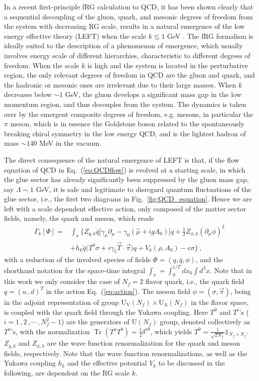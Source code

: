 \documentclass[%
reprint,
superscriptaddress,
showpacs,preprintnumbers,
 amsmath,amssymb,
 aps,
prd,
]{revtex4-1}
\newcommand{\Tr}{\ensuremath{\operatorname{Tr}}}
\def\Fig#1{Fig.~\ref{#1}} \def\Tab#1{Tab.~\ref{#1}}
\def\Eq#1{Eq.~(\ref{#1})}
\begin{document}
In a recent first-principle fRG calculation to QCD, it has been shown clearly that a sequential decoupling of the gluon, quark, and mesonic degrees of freedom from the system with decreasing RG scale, results in a natural emergence of the low energy effective theory (LEFT) when the scale $k\lesssim 1$ GeV \cite{Fu:2019hdw}. The fRG formalism is ideally suited to the description of a phenomenon of emergence, which usually involves energy scale of different hierarchies, characteristic to different degrees of freedom. When the scale $k$ is high and the system is located in the perturbative region, the only relevant degrees of freedom in QCD are the gluon and quark, and the hadronic or mesonic ones are irrelevant due to their large masses. When $k$ decreases below $\sim 1$ GeV, the gluon develops a significant mass gap in the low momentum region, and thus decouples from the system. The dynamics is taken over by the emergent composite degrees of freedom, e.g. mesons, in particular the $\pi$ meson, which is in essence the Goldstone boson related to the spontaneously breaking chiral symmetry in the low energy QCD, and is the lightest hadron of mass $\sim 140$ MeV in the vacuum. 

The direct consequence of the natural emergence of LEFT is that,  if the flow equation of QCD in \Eq{eq:QCDflow} is evolved at a starting scale, in which the glue sector has already significantly been suppressed by the gluon mass gap, say $\Lambda \sim 1$ GeV, it is safe and legitimate to disregard quantum fluctuations of the glue sector, i.e., the first two diagrams in \Fig{fig:QCD_equation}. Hence we are left with a scale dependent effective action, only composed of the matter sector fields, namely, the quark and meson, which reads
\begin{align}
\Gamma_k[\Phi]=&\int_x \bigg\{Z_{q,k}\bar{q} \Big [\gamma_\mu \partial_\mu -\gamma_0(\hat\mu+igA_0) \Big ]q+\frac{1}{2}Z_{\phi,k}(\partial_\mu \phi)^2 \nonumber\\[2ex]
&+h_k\bar{q}\big(T^0\sigma+i\gamma_5\vec{T}\cdot \vec{\pi}\big)q+V_k(\rho,A_0)-c\sigma \bigg\}\,,\label{eq:action}
\end{align}
with a reduction of the involved species of fields $\Phi=(q,\bar q,\phi)$, and the shorthand notation for the space-time integral $\int_{x}=\int_0^{1/T}d x_0 \int d^3 x$. Note that in this work we only consider the case of $N_f=2$ flavor quark, i.e., the quark field $q=(u\,,d)^{T}$ in the action \Eq{eq:action}. The meson field $\phi=\left(\sigma,\vec{\pi}\right)$, being in the adjoint representation of group $\mathrm{U_V}(N_f)\times\mathrm{U_A}(N_f)$ in the flavor space, is coupled with the quark field through the Yukawa coupling. Here $T^0$ and $T^{i}$'s ($i=1\,,2\,,\cdots\,,N_f^2-1$) are the generators of $\mathrm{U}(N_f)$ group, denoted collectively as $T^a$'s, with the normalization $\Tr(T^{a}T^{b})=\frac{1}{2}\delta^{ab}$, which yields $T^{0}=\frac{1}{\sqrt{2N_{f}}}\mathbb{1}_{N_{f}\times N_{f}}$. $Z_{q,k}$ and $Z_{\phi,k}$ are the wave function renormalization for the quark and meson fields, respectively. Note that the wave function renormalizations, as well as the Yukawa coupling $h_k$ and the effective potential $V_k$ to be discussed in the following, are dependent on the RG scale $k$. 
\end{document}
